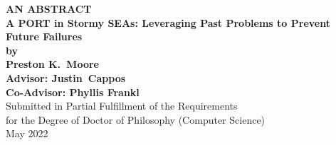 \begin{center}

{\large\bf
   AN ABSTRACT\\[3ex]
   A PORT in Stormy SEAs: Leveraging Past Problems to Prevent Future Failures\\[2ex]
   by\\[3ex]
   Preston K.\ Moore\\[3ex]
   Advisor: Justin\ Cappos\\[2ex]
   Co-Advisor: Phyllis Frankl
}\\[3ex]
Submitted in Partial Fulfillment of the Requirements\\[2ex]
for the Degree of Doctor of Philosophy (Computer Science)\\[3ex]
May 2022
\end{center}

\vspace*{2.5ex}



